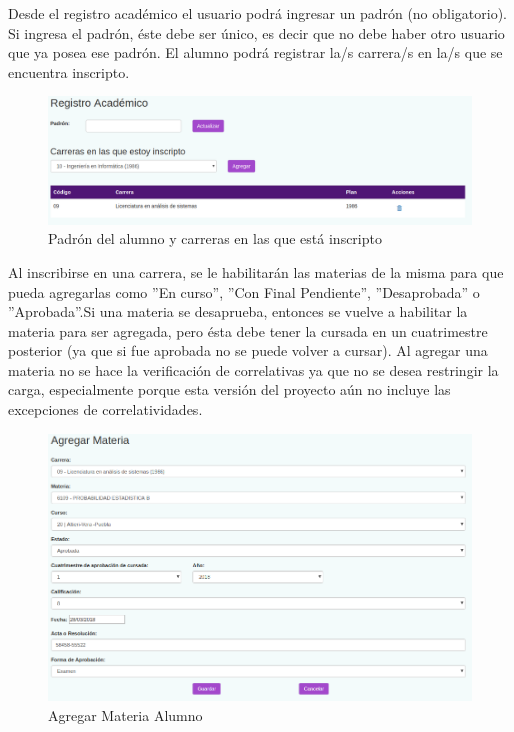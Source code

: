 \documentclass[a4paper]{article}
\begin{document}
Desde el registro académico el usuario podrá ingresar un padrón (no obligatorio). Si ingresa el padrón, éste debe ser único, es decir que no debe haber otro usuario que ya posea ese padrón.
El alumno podrá registrar la/s carrera/s en la/s que se encuentra inscripto.\newline 

\begin{figure}[H]
\centering
\includegraphics[scale=0.3]{Imagenes/padron_y_carreras.png}\par
\caption{Padrón del alumno y carreras en las que está inscripto}
\end{figure}

Al inscribirse en una carrera, se le habilitarán las materias de la misma para que pueda agregarlas como ''En curso'', ''Con Final Pendiente'', ''Desaprobada'' o ''Aprobada''.Si una materia se desaprueba, entonces se vuelve a habilitar la materia para ser agregada, pero ésta debe tener la cursada en un cuatrimestre posterior (ya que si fue aprobada no se puede volver a cursar).
Al agregar una materia no se hace la verificación de correlativas ya que no se desea restringir la carga, especialmente porque esta versión del proyecto aún no incluye las excepciones de correlatividades.\newline

\begin{figure}[H]
\centering
\includegraphics[scale=0.4]{Imagenes/agregar_materia.png}\par
\caption{Agregar Materia Alumno}
\end{figure}
\end{document}
